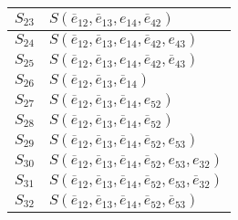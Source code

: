 \documentclass[a4paper]{article}
\begin{document}
\begin{tabular}{|c|l|}
		$ S_{23} $ & $ S(\overline{e}_{12}, \overline{e}_{13}, e_{14}, \overline{e}_{42}) $ \\ \hline
		$ S_{24} $ & $ S(\overline{e}_{12}, \overline{e}_{13}, e_{14}, \overline{e}_{42}, e_{43}) $ \\ \hline
		$ S_{25} $ & $ S(\overline{e}_{12}, \overline{e}_{13}, e_{14}, \overline{e}_{42}, \overline{e}_{43}) $ \\ \hline
		$ S_{26} $ & $ S(\overline{e}_{12}, \overline{e}_{13}, \overline{e}_{14}) $ \\ \hline
		$ S_{27} $ & $ S(\overline{e}_{12}, \overline{e}_{13}, \overline{e}_{14}, e_{52}) $ \\ \hline
		$ S_{28} $ & $ S(\overline{e}_{12}, \overline{e}_{13}, \overline{e}_{14}, \overline{e}_{52}) $ \\ \hline
		$ S_{29} $ & $ S(\overline{e}_{12}, \overline{e}_{13}, \overline{e}_{14}, \overline{e}_{52}, e_{53}) $ \\ \hline
		$ S_{30} $ & $ S(\overline{e}_{12}, \overline{e}_{13}, \overline{e}_{14}, \overline{e}_{52}, e_{53}, e_{32}) $ \\ \hline
		$ S_{31} $ & $ S(\overline{e}_{12}, \overline{e}_{13}, \overline{e}_{14}, \overline{e}_{52}, e_{53}, \overline{e}_{32}) $ \\ \hline
		$ S_{32} $ & $ S(\overline{e}_{12}, \overline{e}_{13}, \overline{e}_{14}, \overline{e}_{52}, \overline{e}_{53}) $ \\ \hline
		\end{tabular}
\end{document}
